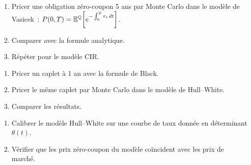 \begin{exercice}
\begin{enumerate}
    \item Pricer une obligation z\'ero-coupon 5 ans par Monte Carlo dans
          le mod\`ele de Vasicek~: $P(0,T) = \mathbb{E}^\mathbb{Q}\!\left[
          e^{-\int_0^T r_t\,dt}\right]$.
    \item Comparer avec la formule analytique.
    \item R\'ep\'eter pour le mod\`ele CIR.
\end{enumerate}
\end{exercice}

\begin{exercice}
\begin{enumerate}
    \item Pricer un caplet \`a 1 an avec la formule de Black.
    \item Pricer le m\^eme caplet par Monte Carlo dans le mod\`ele
          de Hull--White.
    \item Comparer les r\'esultats.
\end{enumerate}
\end{exercice}

\begin{exercice}
\begin{enumerate}
    \item Calibrer le mod\`ele Hull--White sur une courbe de taux donn\'ee
          en d\'eterminant $\theta(t)$.
    \item V\'erifier que les prix z\'ero-coupon du mod\`ele co\"incident
          avec les prix de march\'e.
\end{enumerate}
\end{exercice}
